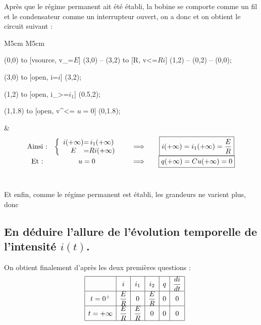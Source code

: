 \documentclass[10pt,dvipsnames,svgnames]{article}
\begin{document}
Après que le régime permanent ait été établi, la bobine se comporte comme un fil et le condensateur comme un interrupteur ouvert, on a donc  et on obtient le circuit suivant :

\begin{tabular}{M{5cm} M{5cm}}
  \begin{circuitikz}
    \draw (0,0)
    to [vsource, v_=$E$] (3,0)
    -- (3,2)
    to [R, v<=$Ri$] (1,2)
    -- (0,2)
    -- (0,0);
    
    \draw (3,0)
    to [open, i=$i$] (3,2);
    
    \draw (1,2)
    to [open, i_>=$ i_1 $] (0.5,2);
    
    \draw (1,1.8)
    to [open, v^<= {$ u = 0 $}] (0,1.8);
  \end{circuitikz}  
  
  & \[
    \begin{array}{c c @{ \hspace{2em} \Longrightarrow \hspace{2em} } c}
      
      \text{Ainsi :} &
                       \left \{
                       \begin{array}{c @{=} c}
                         i(+\infty) & i_1(+\infty) \\
                         E & R i(+\infty)
                       \end{array}
                             \right.
                           &
                             \fbox{$i(+\infty) = i_1(+\infty) = \dfrac{E}{R}$} \\
      \text{Et :} & u = 0 & \fbox{$ q(+\infty) = Cu(+\infty) = 0$}
    \end{array} \raggedright
                             \]\\
\end{tabular}

Et enfin, comme le régime permanent est établi, les grandeurs ne varient plus, donc 

\subsection{En déduire l'allure de l'évolution temporelle de l'intensité $i(t)$.}

On obtient finalement d'après les deux premières questions :
\renewcommand{\arraystretch}{2.3}
\[
\hspace{1em}
\begin{array}{|c|c|c|c|c|c|}
  \hline
  & i &  i_1  &  i_2  &  q  &  \dfrac{di}{dt}   \\
  \hline
  t = 0^+  &  \dfrac{E}{R}  &  0  &  \dfrac{E}{R}  &  0  &  0  \\
  \hline
  t = +\infty & \dfrac{E}{R} & \dfrac{E}{R} & 0 & 0 & 0 \\
  \hline
\end{array}
\]
\end{document}
